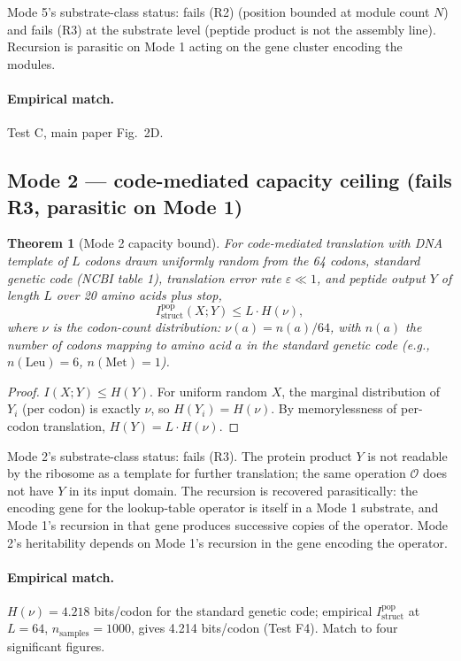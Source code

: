 \documentclass[11pt]{article}
\theoremstyle{plain}
\newtheorem{theorem}{Theorem}
\theoremstyle{definition}
\newcommand{\Istructpop}{I_{\mathrm{struct}}^{\mathrm{pop}}}
\newcommand{\Op}{\mathcal{O}}
\begin{document}
Mode 5's substrate-class status: fails (R2) (position bounded at module count $N$) and fails (R3) at the substrate level (peptide product is not the assembly line). Recursion is parasitic on Mode 1 acting on the gene cluster encoding the modules.

\paragraph{Empirical match.} Test C, main paper Fig.~2D.

\subsection{Mode 2 --- code-mediated capacity ceiling (fails R3, parasitic on Mode 1)}

\begin{theorem}[Mode 2 capacity bound]
\label{thm:mode2}
For code-mediated translation with DNA template of $L$ codons drawn uniformly random from the 64 codons, standard genetic code (NCBI table 1), translation error rate $\varepsilon \ll 1$, and peptide output $Y$ of length $L$ over 20 amino acids plus stop,
\[
\Istructpop(X; Y) \le L \cdot H(\nu),
\]
where $\nu$ is the codon-count distribution: $\nu(a) = n(a)/64$, with $n(a)$ the number of codons mapping to amino acid $a$ in the standard genetic code (e.g., $n(\mathrm{Leu}) = 6$, $n(\mathrm{Met}) = 1$).
\end{theorem}

\begin{proof}
$I(X; Y) \le H(Y)$. For uniform random $X$, the marginal distribution of $Y_i$ (per codon) is exactly $\nu$, so $H(Y_i) = H(\nu)$. By memorylessness of per-codon translation, $H(Y) = L \cdot H(\nu)$.
\end{proof}

Mode 2's substrate-class status: fails (R3). The protein product $Y$ is not readable by the ribosome as a template for further translation; the same operation $\Op$ does not have $Y$ in its input domain. The recursion is recovered parasitically: the encoding gene for the lookup-table operator is itself in a Mode 1 substrate, and Mode 1's recursion in that gene produces successive copies of the operator. Mode 2's heritability depends on Mode 1's recursion in the gene encoding the operator.

\paragraph{Empirical match.} $H(\nu) = 4.218$ bits/codon for the standard genetic code; empirical $\Istructpop$ at $L = 64$, $n_{\mathrm{samples}} = 1000$, gives 4.214 bits/codon (Test F4). Match to four significant figures.
\end{document}
